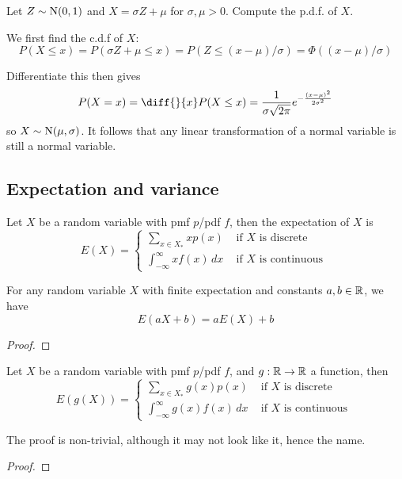 \documentclass[11pt]{article}
\begin{document}
\begin{example}
  Let \(Z\sim\rm{N}(0,1)\) and \(X=\sigma Z+\mu\) for \(\sigma,\mu>0\). Compute the p.d.f. of \(X\).

  We first find the c.d.f of \(X\):
  \[P(X\leq x)=P(\sigma Z+\mu \leq x)=P(Z\leq (x-\mu)/\sigma)=\Phi((x-\mu)/\sigma)\]
  
  Differentiate this then gives
  \[P(X=x)=\diff{}{x}P(X\leq x)=\frac{1}{\sigma\sqrt{2\pi}}e^{-\frac{(x-\mu)^2}{2\sigma^2}}\]
  so \(X\sim\rm{N}(\mu,\sigma)\). It follows that any linear transformation of a normal variable is still a normal variable.
\end{example}


\subsection{Expectation and variance}
\begin{definition}[Expectation]
  Let \(X\) be a random variable with pmf \(p\)/pdf \(f\), then the expectation of \(X\) is
  \[E(X)=\begin{cases}
    \sum_{x\in X_*}xp(x)&\text{ if \(X\) is discrete}\\ 
    \int_{-\infty}^{\infty}xf(x)\,dx&\text{ if \(X\) is continuous }
  \end{cases}\]
\end{definition}

\begin{proposition}
  For any random variable \(X\) with finite expectation and constants \(a,b\in\R\), we have
  \[E(aX+b)=aE(X)+b\]
\end{proposition}
\begin{proof}
\end{proof}

\begin{theorem}
  Let \(X\) be a random variable with pmf \(p\)/pdf \(f\), and \(g:\R\to\R\) a function, then
  \[E(g(X))=\begin{cases}
    \sum_{x\in X_*}g(x)p(x)&\text{ if \(X\) is discrete}\\ 
    \int_{-\infty}^{\infty}g(x)f(x)\,dx&\text{ if \(X\) is continuous }
  \end{cases}\]
\end{theorem}
The proof is non-trivial, although it may not look like it, hence the name.
\begin{proof}
\end{proof}
\end{document}
